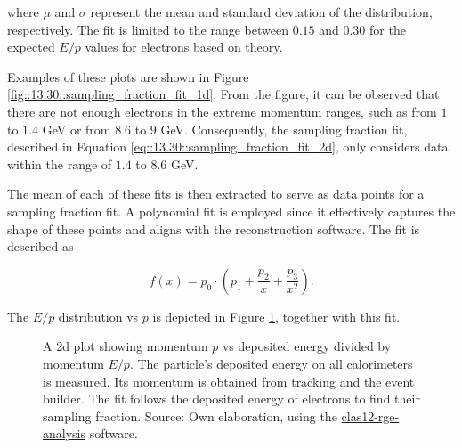     where $\mu$ and $\sigma$ represent the mean and standard deviation of the distribution, respectively. The fit is limited to the range between $0.15$ and $0.30$ for the expected $E/p$ values for electrons based on theory.

    Examples of these plots are shown in Figure \ref{fig::13.30::sampling_fraction_fit_1d}.
    From the figure, it can be observed that there are not enough electrons in the extreme momentum ranges, such as from $1$ to $1.4$ GeV or from $8.6$ to $9$ GeV.
    Consequently, the sampling fraction fit, described in Equation \eqref{eq::13.30::sampling_fraction_fit_2d}, only considers data within the range of $1.4$ to $8.6$ GeV.

    The mean of each of these fits is then extracted to serve as data points for a sampling fraction fit.
    A polynomial fit is employed since it effectively captures the shape of these points and aligns with the reconstruction software.
    The fit is described as

    \begin{equation} \label{eq::13.30::sampling_fraction_fit_2d}
        f(x) = p_0 \cdot \left(p_1 + \frac{p_2}{x} + \frac{p_3}{x^2}\right).
    \end{equation}

    The $E/p$ distribution vs $p$ is depicted in Figure \ref{fig::13.30::sampling_fraction_fit_2d}, together with this fit.

    \begin{figure}[t!]
        \centering{}
        \caption[Calorimeters $p vs E/p$ plots]{A 2d plot showing momentum $p$ vs deposited energy divided by momentum $E/p$.
        The particle's deposited energy on all calorimeters is measured.
        Its momentum is obtained from tracking and the event builder.
        The fit follows the deposited energy of electrons to find their sampling fraction.
        Source: Own elaboration, using the \hyperlink{github.com/bleaktwig/clas12-rge-analysis}{clas12-rge-analysis} software.}
        \label{fig::13.30::sampling_fraction_fit_2d}
    \end{figure}


